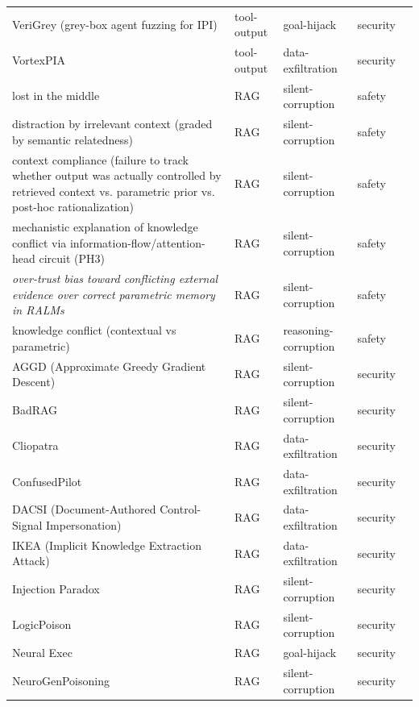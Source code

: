 \begin{longtable}{@{}>{\raggedright\arraybackslash}p{}llll@{}}
VeriGrey (grey-box agent fuzzing for IPI) & tool-output & goal-hijack & security & \cite{zhang-2026-verigrey} \\
VortexPIA & tool-output & data-exfiltration & security & \cite{cui-2025-vortexpia} \\
lost in the middle & RAG & silent-corruption & safety & \cite{liu-2023-lost} \\
distraction by irrelevant context (graded by semantic relatedness) & RAG & silent-corruption & safety & \cite{wu-2024-easily} \\
context compliance (failure to track whether output was actually controlled by retrieved context vs. parametric prior vs. post-hoc rationalization) & RAG & silent-corruption & safety & \cite{chen-2026-rag} \\
mechanistic explanation of knowledge conflict via information-flow/attention-head circuit (PH3) & RAG & silent-corruption & safety & \cite{jin-2024-cutting} \\
\emph{over-trust bias toward conflicting external evidence over correct parametric memory in RALMs} & RAG & silent-corruption & safety & \cite{jin-2024-tugofwar} \\
knowledge conflict (contextual vs parametric) & RAG & reasoning-corruption & safety & \cite{yuan-2024-discerning} \\
AGGD (Approximate Greedy Gradient Descent) & RAG & silent-corruption & security & \cite{su-2024-corpus} \\
BadRAG & RAG & silent-corruption & security & \cite{xue-2024-badrag} \\
Cliopatra & RAG & data-exfiltration & security & \cite{annamalai-2026-cliopatra} \\
ConfusedPilot & RAG & data-exfiltration & security & \cite{roychowdhury-2024-confusedpilot} \\
DACSI (Document-Authored Control-Signal Impersonation) & RAG & data-exfiltration & security & \cite{zhu-2026-documentauthored} \\
IKEA (Implicit Knowledge Extraction Attack) & RAG & data-exfiltration & security & \cite{wang-2025-silent} \\
Injection Paradox & RAG & silent-corruption & security & \cite{paeng-2026-injection} \\
LogicPoison & RAG & silent-corruption & security & \cite{xiao-2026-logicpoison} \\
Neural Exec & RAG & goal-hijack & security & \cite{pasquini-2024-neural} \\
NeuroGenPoisoning & RAG & silent-corruption & security & \cite{zhu-2025-neurogenpoisoning} \\

\end{longtable}
